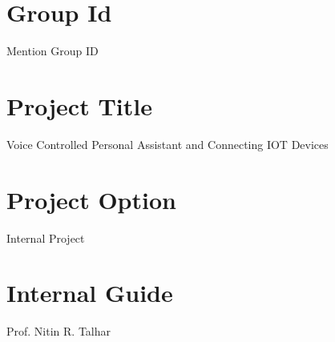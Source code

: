 \documentclass[oneside,a4paper,12pt]{article}
\begin{document}
\section{Group Id}
Mention Group ID

\section{Project Title}
Voice Controlled Personal Assistant and Connecting IOT Devices
\section{ Project Option }
Internal Project

\section{Internal Guide}
Prof. Nitin R. Talhar
\end{document}
